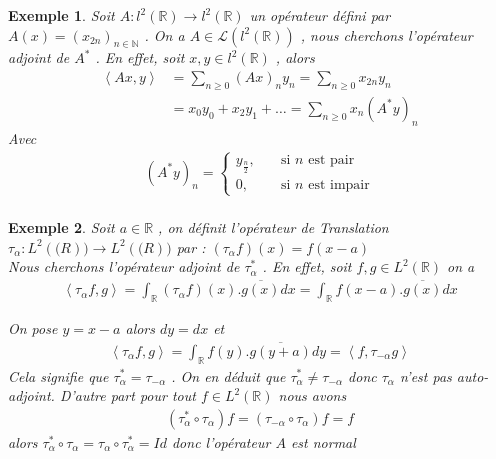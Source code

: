 \documentclass{report}
\newtheorem{Ex}{Exemple}[subsection]
\begin{document}
{\begin{Ex} Soit $A: l^2(\mathbb{R}) \rightarrow l^2(\mathbb{R})$ un opérateur défini par $A(x) = (x_{2n})_{n\in \mathbb{N}}$ . On a $A \in \mathscr{L}(l^2(\mathbb{R}))$ , nous cherchons l'opérateur adjoint de $A^*$ . En effet, soit $x,y \in l^2(\mathbb{R})$ , alors 
					\begin{align*}
					 \left< Ax,y \right> &= \sum_{n\ge 0} (A x)_n y_n = \sum_{n\ge 0} x_{2n}y_n \\
					  &= x_0 y_0 + x_2 y_1 + \ldots = \sum_{n\ge 0} x_n (A^* y)_n
					\end{align*}
Avec 
				\begin{align*}
				 (A^* y)_n = \begin{cases}
									y_{\frac{n}{2}},\quad  & \text{si} \,\, n \,\, \text{est pair} \\
									0,  & \text{si} \,\, n \,\, \text{est  impair} 
							   \end{cases} \\
				\end{align*}


\end{Ex} 
\begin{Ex}
Soit $a \in \mathbb{R}$ , on définit l'opérateur de Translation $\tau_{\alpha} : L^2(\mathbb(R)) \rightarrow L^2(\mathbb(R))$ par : $(\tau_{\alpha} f)(x) = f(x-a)$ \\
Nous cherchons l'opérateur adjoint de $\tau_{\alpha}^*$ . En effet, soit $f, g \in L^2(\mathbb{R})$ on a 
					 \begin{align*}
					 \left< \tau_{\alpha} f, g \right> = \int_{\mathbb{R}} (\tau_{\alpha} f)(x).\overline{g(x)} dx = \int_{\mathbb{R}} f(x-a).\overline{g(x)} dx
					 \end{align*}

On pose $y = x - a$ alors $dy = dx$ et 
					\begin{align*}
					 \left< \tau_{\alpha} f,g \right> = \int_{\mathbb{R}} f(y).\overline{g(y + a)} dy = \left< f,\tau_{-\alpha} g \right> 
					\end{align*}
Cela signifie que $\tau_{\alpha}^* = \tau_{-\alpha}$ . On en déduit que $\tau_{\alpha}^* \neq \tau_{-\alpha}$ donc $\tau_{\alpha}$ n'est pas auto-adjoint.
D'autre part pour tout $f \in L^2(\mathbb{R})$ nous avons 
					\begin{align*}
					 (\tau_{\alpha}^* \circ \tau_{\alpha})f = (\tau_{-\alpha} \circ \tau_{\alpha})f = f 
					\end{align*}
alors $\tau_{\alpha}^* \circ \tau_{\alpha} = \tau_{\alpha} \circ \tau_{\alpha}^* = Id$ donc l'opérateur $A$ est normal 
\end{Ex}



}
\end{document}
